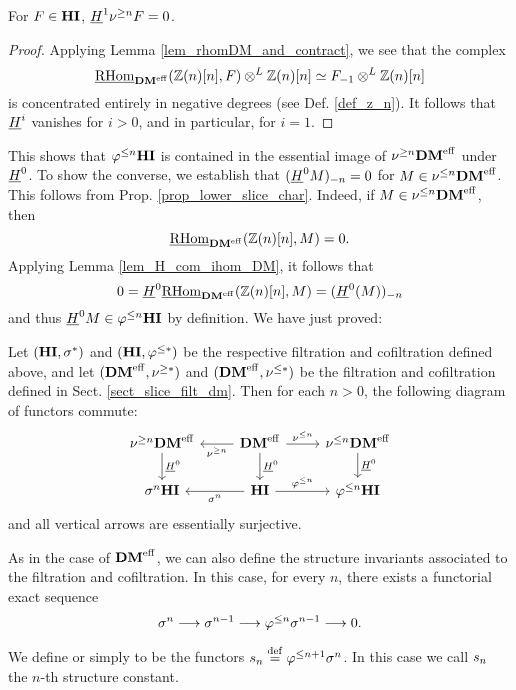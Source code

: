 \begin{lem}\label{lem_H1_sgDM_vanishes}
For $F \in \HI$, $\sheaf{H}^1 \sgDM{n} F = 0$.
\end{lem}
\begin{proof}
Applying Lemma \ref{lem_rhomDM_and_contract}, we see that the
complex
\[
\ihomDMf(\Z(n)[n], F) \tDM \Z(n)[n] \simeq \RHI{F} \tDM \Z(n)[n]
\] 
is concentrated entirely in negative degrees (see Def. \ref{def_z_n}).
It follows that $\sheaf{H}^i$ vanishes for $i > 0$, and in particular,
for $i = 1$.
\end{proof}

This shows that $\tlHI{n}\HI$ is contained in the essential image 
of $\sgDM{n}\DMeff$ under $\sheaf{H}^0$. To show the converse, we 
establish that $\RHI[n]{(\sheaf{H}^0 M)} = 0$ for $M \in 
\slDM{n}\DMeff$. This follows from Prop. 
\ref{prop_lower_slice_char}. Indeed, if $M \in \slDM{n}\DMeff$, 
then 
\[
\ihomDMf(\Z(n)[n], M) = 0.
\] 
Applying Lemma \ref{lem_H_com_ihom_DM}, it follows that
\[
0 = \sheaf{H}^0\ihomDMf(\Z(n)[n], M) = \RHI[n]{(\sheaf{H}^0(M))}
\]
and thus $\sheaf{H}^0 M \in \tlHI{n}\HI$ by definition. We
have just proved:

\begin{prop}\label{prop_H_commute_with_filt}
Let $(\HI, \sgHI{*})$ and $(\HI, \tlHI{*})$ be the respective 
filtration and cofiltration defined above, and let $(\DMeff, 
\sgDM{*})$ and $(\DMeff, \slDM{*})$ be the filtration and
cofiltration defined in Sect. \ref{sect_slice_filt_dm}. Then
for each $n > 0$, the following diagram of functors commute:
\[
\begin{tikzcd}
\sgDM{n}\DMeff \arrow{d}{\sheaf{H}^0} &
\DMeff \arrow{l}{\sgDM{n}} \arrow{r}{\slDM{n}} \arrow{d}{\sheaf{H}^0} &
\slDM{n}\DMeff \arrow{d}{\sheaf{H}^0} \\
\sgHI{n}\HI &
\HI \arrow{l}{\sgHI{n}} \arrow{r}{\tlHI{n}} &
\tlHI{n}\HI 
\end{tikzcd}
\]
and all vertical arrows are essentially surjective.
\end{prop}

As in the case of $\DMeff$, we can also define the structure 
invariants associated to the filtration and cofiltration. In this
case, for every $n$, there exists a functorial exact sequence
\[
\sgHI{n} \to \sgHI{n - 1} \to \tlHI{n}\sgHI{n - 1} \to 0.
\]
\begin{defn}
We define  or simply 
to be the functors $\slice{n} \defeq \tlHI{n + 1}\sgHI{n}$. In
this case we call $\slice{n}$ the $n$-th structure constant.
\end{defn}

